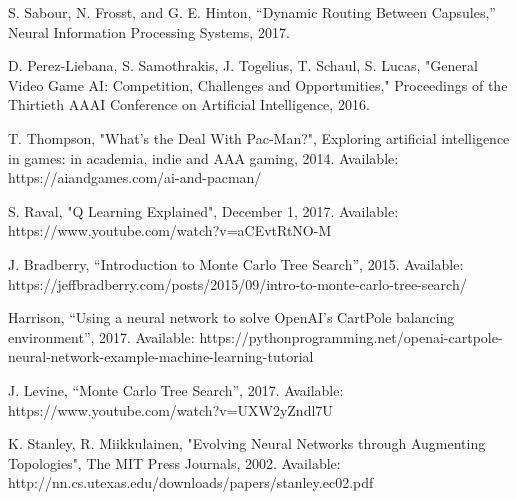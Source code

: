 \documentclass[12pt,journal,compsoc]{IEEEtran}
\begin{document}
\begin{thebibliography}{1}

    S. Sabour, N. Frosst, and G. E. Hinton, “Dynamic Routing Between Capsules,” Neural Information Processing Systems, 2017.

    D. Perez-Liebana, S. Samothrakis, J. Togelius, T. Schaul, S. Lucas, "General Video Game AI: Competition, Challenges and Opportunities," Proceedings of the Thirtieth AAAI Conference on Artificial Intelligence, 2016.

    T. Thompson, "What's the Deal With Pac-Man?", Exploring artificial intelligence in games: in academia, indie and AAA gaming, 2014. Available: https://aiandgames.com/ai-and-pacman/

    S. Raval, "Q Learning Explained", December 1, 2017. Available: https://www.youtube.com/watch?v=aCEvtRtNO-M

	J. Bradberry, “Introduction to Monte Carlo Tree Search”, 2015. Available: https://jeffbradberry.com/posts/2015/09/intro-to-monte-carlo-tree-search/

	Harrison, “Using a neural network to solve OpenAI's CartPole balancing environment”, 2017. Available: https://pythonprogramming.net/openai-cartpole-neural-network-example-machine-learning-tutorial

	J. Levine, “Monte Carlo Tree Search”, 2017. Available: https://www.youtube.com/watch?v=UXW2yZndl7U

		K. Stanley, R. Miikkulainen, "Evolving Neural Networks through Augmenting Topologies", The MIT Press Journals, 2002. Available: http://nn.cs.utexas.edu/downloads/papers/stanley.ec02.pdf

\end{thebibliography}
\end{document}

